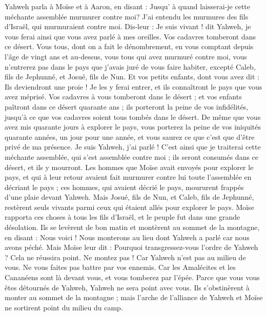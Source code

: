 \begin{multicols}{2}
Yahweh parla à Moïse et à Aaron, en disant :
Jusqu’ à quand laisserai-je cette méchante assemblée murmurer contre moi? J'ai entendu les murmures des fils d'Israël, qui murmuraient contre moi.
Dis-leur : Je suis vivant ! dit Yahweh, je vous ferai ainsi que vous avez parlé à mes oreilles.
Vos cadavres tomberont dans ce désert. Vous tous, dont on a fait le dénombrement, en vous comptant depuis l’âge de vingt ans et au-dessus, vous tous qui avez murmuré contre moi,
vous n’entrerez pas dans le pays que j’avais juré de vous faire habiter, excepté Caleb, fils de Jephunné, et Josué, fils de Nun.
Et vos petits enfants, dont vous avez dit : Ils deviendront une proie ! Je les y ferai entrer, et ils connaîtront le pays que vous avez méprisé.
Vos cadavres à vous tomberont dans le désert ;
et vos enfants paîtront dans ce désert quarante ans ; ils porteront la peine de vos infidélités, jusqu'à ce que vos cadavres soient tous tombés dans le désert.
De même que vous avez mis quarante jours à explorer le pays, vous porterez la peine de vos iniquités quarante années, un jour pour une année, et vous saurez ce que c’est que d’être privé de ma présence.
Je suis Yahweh, j’ai parlé ! C’est ainsi que je traiterai cette méchante assemblée, qui s’est assemblée contre moi ; ils seront consumés dans ce désert, et ils y mourront.
Les hommes que Moïse avait envoyés pour explorer le pays, et qui à leur retour avaient fait murmurer contre lui toute l'assemblée en décriant le pays ;
ces hommes, qui avaient décrié le pays, moururent frappés d’une plaie devant Yahweh.
Mais Josué, fils de Nun, et Caleb, fils de Jephunné, restèrent seuls vivants parmi ceux qui étaient allés pour explorer le pays.
Moïse rapporta ces choses à tous les fils d'Israël, et le peuple fut dans une grande désolation.
Ils se levèrent de bon matin et montèrent au sommet de la montagne, en disant : Nous voici ! Nous monterons au lieu dont Yahweh a parlé car nous avons péché.
Mais Moïse leur dit : Pourquoi transgressez-vous l’ordre de Yahweh ? Cela ne réussira point.
Ne montez pas ! Car Yahweh n'est pas au milieu de vous. Ne vous faites pas battre par vos ennemis.
Car les Amalécites et les Cananéens sont là devant vous, et vous tomberez par l'épée. Parce que vous vous êtes détournés de Yahweh, Yahweh ne sera point avec vous.
Ils s'obstinèrent à monter au sommet de la montagne ; mais l'arche de l'alliance de Yahweh et Moïse ne sortirent point du milieu du camp.

\end{multicols}

